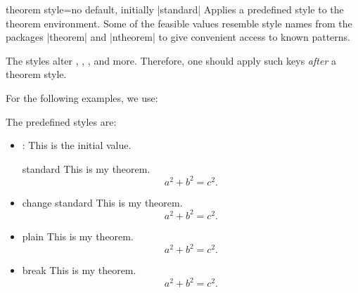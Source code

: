 \clearpage
\begin{docTcbKey}{theorem style}{=}{no default, initially |standard|}
Applies a predefined style  to the theorem environment. Some of
the feasible  values resemble style names from the packages |theorem|
and |ntheorem| to give convenient access to known patterns.
\begin{marker}
The styles alter , ,
, and more. Therefore, one should apply such
keys \emph{after} a theorem style.
\end{marker}

For the following examples, we use:

The predefined styles are:
\begin{itemize}
%
\item{}: This is the initial value.
\begin{dispExample}
\begin{theorem}[theorem style=standard]{standard}{}
This is my theorem. \begin{equation*} a^2 + b^2 = c^2. \end{equation*}
\end{theorem}
\end{dispExample}
%
\item{}
\begin{dispExample}
\begin{theorem}[theorem style=change standard]{change standard}{}
This is my theorem. \begin{equation*} a^2 + b^2 = c^2. \end{equation*}
\end{theorem}
\end{dispExample}
%
\item{}
\begin{dispExample}
\begin{theorem}[theorem style=plain]{plain}{}
This is my theorem. \begin{equation*} a^2 + b^2 = c^2. \end{equation*}
\end{theorem}
\end{dispExample}
%
\clearpage
\item{}
\begin{dispExample}
\begin{theorem}[theorem style=break]{break}{}
This is my theorem. \begin{equation*} a^2 + b^2 = c^2. \end{equation*}

\end{theorem}
\end{dispExample}
\end{itemize}
\end{docTcbKey}
